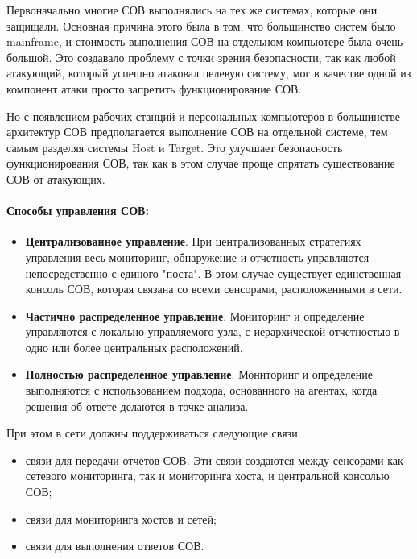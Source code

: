 Первоначально многие СОВ выполнялись на тех же системах, которые они защищали.
Основная причина этого была в том, что большинство систем было mainframe, и стоимость
выполнения СОВ на отдельном компьютере была очень большой. Это создавало проблему с
точки зрения безопасности, так как любой атакующий, который успешно атаковал целевую
систему, мог в качестве одной из компонент атаки просто запретить функционирование СОВ.

Но с появлением рабочих станций и персональных компьютеров в большинстве архитектур
СОВ предполагается выполнение СОВ на отдельной системе, тем самым разделяя системы
Host и Target. Это улучшает безопасность функционирования СОВ, так как в этом случае
проще спрятать существование СОВ от атакующих.

\paragraph*{Способы управления СОВ:}

\begin{itemize}
	\item \textbf{Централизованное управление}. При централизованных стратегиях управления
	весь мониторинг, обнаружение и отчетность управляются непосредственно с единого "поста".
	В этом случае существует единственная консоль СОВ, которая связана со всеми сенсорами,
	расположенными в сети.

	\item \textbf{Частично распределенное управление}. Мониторинг и определение управляются
	с локально управляемого узла, с иерархической отчетностью в одно или более центральных
	расположений.

	\item \textbf{Полностью распределенное управление}. Мониторинг и определение выполняются
	с использованием подхода, основанного на агентах, когда решения об ответе делаются в
	точке анализа.
\end{itemize}

При этом в сети должны поддерживаться следующие связи:

\begin{itemize}
	\item связи для передачи отчетов СОВ. Эти связи создаются между сенсорами как сетевого
	мониторинга, так и мониторинга хоста, и центральной консолью СОВ;

	\item связи для мониторинга хостов и сетей;

	\item связи для выполнения ответов СОВ.
\end{itemize}

